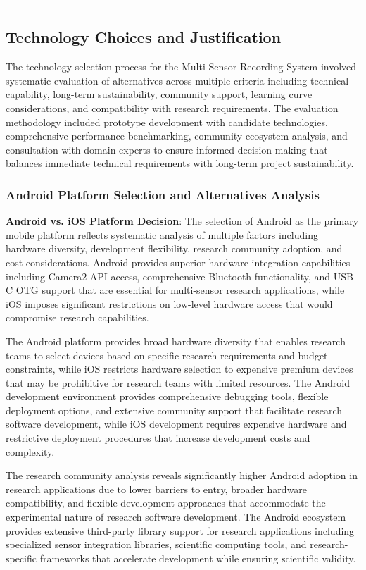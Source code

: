 \documentclass[12pt,a4paper]{report}
\begin{document}
\hrule

\subsection{Technology Choices and Justification}

The technology selection process for the Multi-Sensor Recording System involved systematic evaluation of alternatives
across multiple criteria including technical capability, long-term sustainability, community support, learning curve
considerations, and compatibility with research requirements. The evaluation methodology included prototype development
with candidate technologies, comprehensive performance benchmarking, community ecosystem analysis, and consultation with
domain experts to ensure informed decision-making that balances immediate technical requirements with long-term project
sustainability.

\subsubsection{Android Platform Selection and Alternatives Analysis}

\textbf{Android vs. iOS Platform Decision}: The selection of Android as the primary mobile platform reflects systematic
analysis of multiple factors including hardware diversity, development flexibility, research community adoption, and
cost considerations. Android provides superior hardware integration capabilities including Camera2 API access,
comprehensive Bluetooth functionality, and USB-C OTG support that are essential for multi-sensor research applications,
while iOS imposes significant restrictions on low-level hardware access that would compromise research capabilities.

The Android platform provides broad hardware diversity that enables research teams to select devices based on specific
research requirements and budget constraints, while iOS restricts hardware selection to expensive premium devices that
may be prohibitive for research teams with limited resources. The Android development environment provides comprehensive
debugging tools, flexible deployment options, and extensive community support that facilitate research software
development, while iOS development requires expensive hardware and restrictive deployment procedures that increase
development costs and complexity.

The research community analysis reveals significantly higher Android adoption in research applications due to lower
barriers to entry, broader hardware compatibility, and flexible development approaches that accommodate the experimental
nature of research software development. The Android ecosystem provides extensive third-party library support for
research applications including specialized sensor integration libraries, scientific computing tools, and
research-specific frameworks that accelerate development while ensuring scientific validity.
\end{document}
